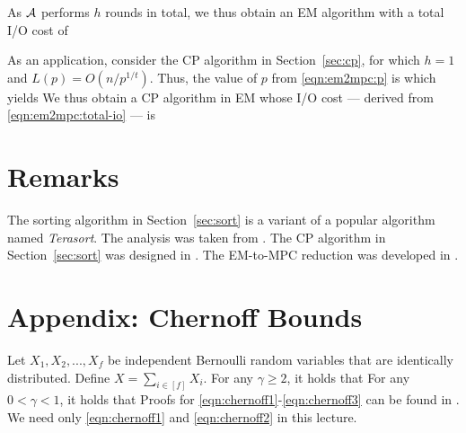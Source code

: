 As $\mathcal{A}$ performs $h$ rounds in total, we thus obtain an EM algorithm with a total I/O cost of

As an application, consider the CP algorithm in Section~\ref{sec:cp}, for which $h = 1$ and $L(p) = O(n / p^{1/t})$. Thus, the value of $p$ from \eqref{eqn:em2mpc:p} is
which yields
We thus obtain a CP algorithm in EM whose I/O cost --- derived from \eqref{eqn:em2mpc:total-io} --- is

\section{Remarks}

The sorting algorithm in Section~\ref{sec:sort} is a variant of a popular algorithm named {\em Terasort}. The analysis was taken from \cite{tlx13}. The CP algorithm in Section~\ref{sec:sort} was designed in \cite{au11}. The EM-to-MPC reduction was developed in \cite{kbs16}.




\appendix

\section*{Appendix: Chernoff Bounds}

    Let $X_1, X_2, ..., X_f$ be independent Bernoulli random variables that are identically distributed. Define $X = \sum_{i \in [f]} X_i$. For any $\gamma \geq 2$, it holds that
    For any $0 < \gamma < 1$, it holds that
Proofs for \eqref{eqn:chernoff1}-\eqref{eqn:chernoff3} can be found in \cite{stl12}. We need only \eqref{eqn:chernoff1} and \eqref{eqn:chernoff2} in this lecture.


